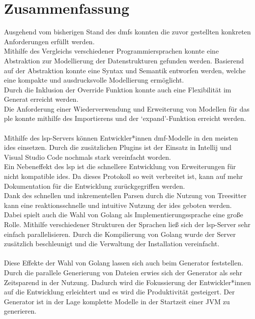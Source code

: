 \documentclass[./einleitung.tex]{subfiles}
\begin{document}
\chapter{Zusammenfassung}\label{ch:zusammenfassung}
Ausgehend vom bisherigen Stand des \acrshort{dmf}s konnten die zuvor gestellten konkreten Anforderungen erfüllt werden.\\
Mithilfe des Vergleichs verschiedener Programmiersprachen konnte eine Abstraktion zur Modellierung der Datenstrukturen gefunden werden.
Basierend auf der Abstraktion konnte eine Syntax und Semantik entworfen werden, welche eine kompakte und ausdrucksvolle Modellierung ermöglicht.\\
Durch die Inklusion der Override Funktion konnte auch eine Flexibilität im Generat erreicht werden.\\
Die Anforderung einer Wiederverwendung und Erweiterung von Modellen für das \acrshort{ple} konnte mithilfe des Importierens und der `expand'-Funktion erreicht werden.
\\\\
Mithilfe des \acrshort{lsp}-Servers können Entwickler*innen \acrshort{dmf}-Modelle in den meisten \acrshort{ide}s einsetzen.
Durch die zusätzlichen Plugins ist der Einsatz in Intellij und Visual Studio Code nochmals stark vereinfacht worden.\\
Ein Nebeneffekt des \acrshort{lsp} ist die schnellere Entwicklung von Erweiterungen für nicht kompatible \acrshort{ide}s.
Da dieses Protokoll so weit verbreitet ist, kann auf mehr Dokumentation für die Entwicklung zurückgegriffen werden.\\
Dank des schnellen und inkrementellen Parsen durch die Nutzung von Treesitter kann eine reaktionsschnelle und intuitive Nutzung der \acrshort{ide}s geboten werden.
Dabei spielt auch die Wahl von Golang als Implementierungssprache eine große Rolle.
Mithilfe verschiedener Strukturen der Sprachen ließ sich der \acrshort{lsp}-Server sehr einfach parallelisieren.
Durch die Kompilierung von Golang wurde der Server zusätzlich beschleunigt und die Verwaltung der Installation vereinfacht.
\\\\
Diese Effekte der Wahl von Golang lassen sich auch beim Generator feststellen.
Durch die parallele Generierung von Dateien erwies sich der Generator als sehr Zeitsparend in der Nutzung.
Dadurch wird die Fokussierung der Entwickler*innen auf die Entwicklung erleichtert und es wird die Produktivität gesteigert.
Der Generator ist in der Lage komplette Modelle in der Startzeit einer JVM zu generieren.\\
\end{document}
